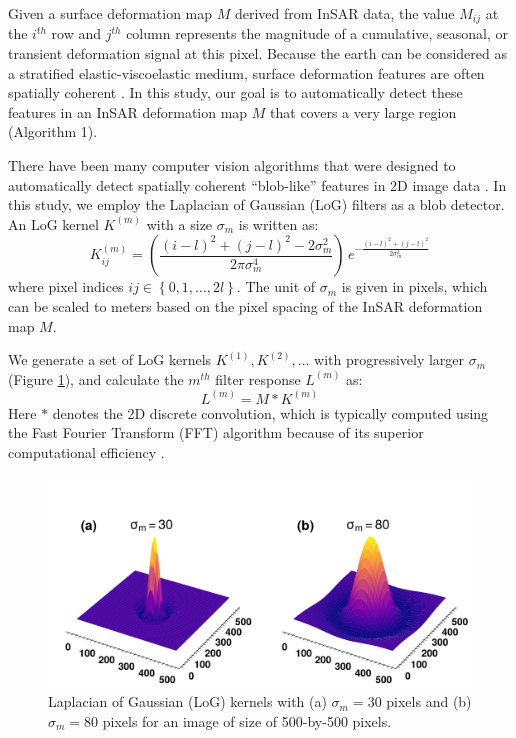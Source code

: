 Given a surface deformation map $M$ derived from InSAR data, the value $ M_{ij} $ at the $i^{th}$ row and $j^{th}$ column represents the magnitude of a cumulative, seasonal, or transient deformation signal at this pixel. Because the earth can be considered as a stratified elastic-viscoelastic medium, surface deformation features are often spatially coherent \citep{Segall2010EarthquakeVolcanoDeformation}. In this study, our goal is to automatically detect these features in an InSAR deformation map $M$ that covers a very large region (Algorithm 1).

There have been many computer vision algorithms that were designed to automatically detect spatially coherent ``blob-like'' features in 2D image data \citep{Lindeberg1993DetectingSalientBlob, Lindeberg1998FeatureDetectionAutomatic, Lowe2004DistinctiveImageFeatures}. In this study, we employ the Laplacian of Gaussian (LoG) filters as a blob detector. An LoG kernel $K^{(m)}$ with a size $\sigma_m$ is written as:
\begin{equation}
	K^{(m)}_{ij} = \left(\frac{(i - l)^2 + (j - l)^2 - 2\sigma_m^2}{2 \pi \sigma_m^4}\right) \, e^{-\frac{ (i - l)^2 + (j - l)^2}{2 \sigma_m^2}} \label{eq:log-kernel}
\end{equation}
where pixel indices $ij  \in \left\lbrace 0, 1, \ldots, 2l \right\rbrace$. The unit of $\sigma_m$ is given in pixels, which can be scaled to meters based on the pixel spacing of the InSAR deformation map $M$.


We generate a set of LoG kernels $K^{(1)}, K^{(2)}, \ldots$ with progressively larger $\sigma_m$ (Figure \ref{fig:log-kernel}), and calculate the $m^{th}$ filter response $ L^{(m)} $ as:
\begin{equation}
	L^{(m)} = M \ast K^{(m)}  \label{eq:log-layer-conv}
\end{equation}
Here $*$ denotes the 2D discrete convolution, which is typically computed using the Fast Fourier Transform (FFT) algorithm because of its superior computational efficiency \citep{Szeliski2022ComputerVision}.


\begin{figure}[hbt!]
	\centering
	\includegraphics[width=0.98\linewidth]{paper2/figures/figure1_log_examples.pdf}
	\caption[Laplacian of Gaussian (LoG) kernels]{
		Laplacian of Gaussian (LoG) kernels with (a) $\sigma_m=30$ pixels and (b) $\sigma_m=80$ pixels for an image of size of 500-by-500 pixels.
	}
	\label{fig:log-kernel}
\end{figure}

